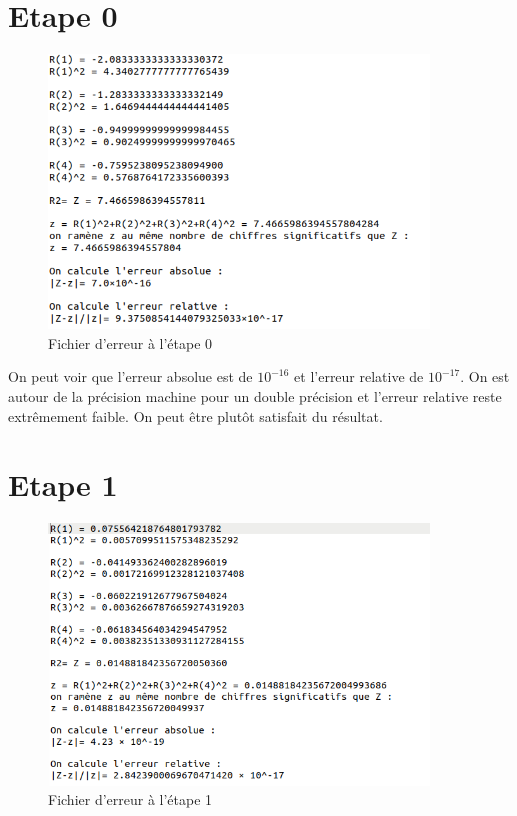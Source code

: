\documentclass[12,french]{report}
\begin{document}
\section{Etape 0}

\begin{figure}[H]
	\center
	\includegraphics[width=0.9\textwidth]{./Images/r_0_err}
	\caption{Fichier d'erreur à l'étape 0}
\end{figure}

On peut voir que l'erreur absolue est de $10^{-16}$ et l'erreur relative de $10^{-17}$. On est autour de la précision machine pour un double précision et l'erreur relative reste extrêmement faible. On peut être plutôt satisfait du résultat.

\section{Etape 1}

\begin{figure}[H]
	\center
	\includegraphics[width=0.9\textwidth]{./Images/r_1_err}
	\caption{Fichier d'erreur à l'étape 1}
\end{figure}
\end{document}
